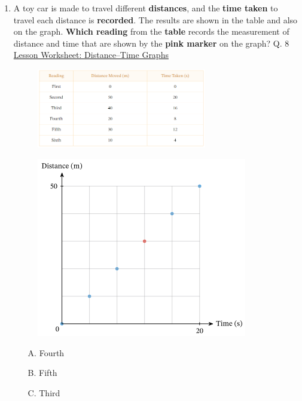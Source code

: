 \documentclass[A4,12pt]{article}
\begin{document}
\begin{enumerate}[label=\bfseries (\arabic*)]
\item A toy car is made to travel different \textbf{distances}, and the \textbf{time taken} to travel each distance is \textbf{recorded}. The results are shown in the table and also on the graph. \textbf{Which reading} from the \textbf{table} records the measurement of distance and time that are shown by the \textbf{pink marker} on the graph? \cite{Nagwa} Q. 8 \href{https://www.nagwa.com/en/worksheets/932192593730/}{Lesson Worksheet: Distance–Time Graphs}
%
\begin{figure}[H]
    \centering
    \includegraphics[width=0.7\textwidth]{Nagwa_Q8_kin-1.png}
\end{figure}
%
\begin{figure}[H]
    \centering
    \includegraphics{Nagwa_Q8_kin-2.png}
\end{figure}
%
\begin{itemize}
    \item[A.] Fourth
    \item[B.] Fifth
    \item[C.] Third
\end{itemize}
%

\end{enumerate}
\end{document}
